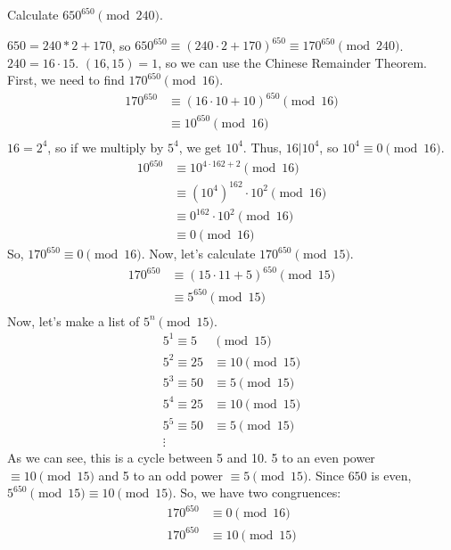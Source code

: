 \documentclass{article}
\begin{document}
\begin{problem}{}{}
    Calculate $650^{650} \pmod{240}$.
\end{problem}
\begin{solution}{}{}
    $650=240*2+170$, so $650^{650}\equiv(240\cdot2+170)^{650}\equiv170^{650}\pmod{240}$. $240=16\cdot15$. $(16,15)=1$, so we can use the Chinese Remainder Theorem. First, we need to find $170^{650}\pmod{16}$.
    \begin{align*}
        170^{650}&\equiv(16\cdot10+10)^{650}\pmod{16} \\
        &\equiv10^{650}\pmod{16} \\
    \end{align*}
    $16=2^4$, so if we multiply by $5^4$, we get $10^4$. Thus, $16|10^4$, so $10^{4}\equiv0\pmod{16}$.
    \begin{align*}
        10^{650}&\equiv10^{4\cdot162+2}\pmod{16} \\
        &\equiv(10^4)^{162}\cdot10^2\pmod{16} \\
        &\equiv0^{162}\cdot10^2\pmod{16} \\
        &\equiv0\pmod{16}
    \end{align*}
    So, $170^{650}\equiv0\pmod{16}$. Now, let's calculate $170^{650}\pmod{15}$.
    \begin{align*}
        170^{650}&\equiv(15\cdot11+5)^{650}\pmod{15} \\
        &\equiv5^{650}\pmod{15} \\
    \end{align*}
    Now, let's make a list of $5^n\pmod{15}$.
    \begin{align*}
        5^1 \equiv 5 &\pmod{15} \\
        5^2 \equiv 25 &\equiv 10 \pmod{15} \\
        5^3 \equiv 50 &\equiv 5 \pmod{15} \\
        5^4 \equiv 25 &\equiv 10 \pmod{15} \\
        5^5 \equiv 50 &\equiv 5 \pmod{15} \\
        \vdots&
    \end{align*}
    As we can see, this is a cycle between 5 and 10. 5 to an even power $\equiv 10\pmod{15}$ and 5 to an odd power $\equiv 5\pmod{15}$. Since $650$ is even, $5^{650}\pmod{15}\equiv{10}\pmod{15}$. So, we have two congruences:
    \begin{align*}
        170^{650} &\equiv 0 \pmod{16} \\
        170^{650} &\equiv 10 \pmod{15}
    \end{align*}

\end{solution}
\end{document}
